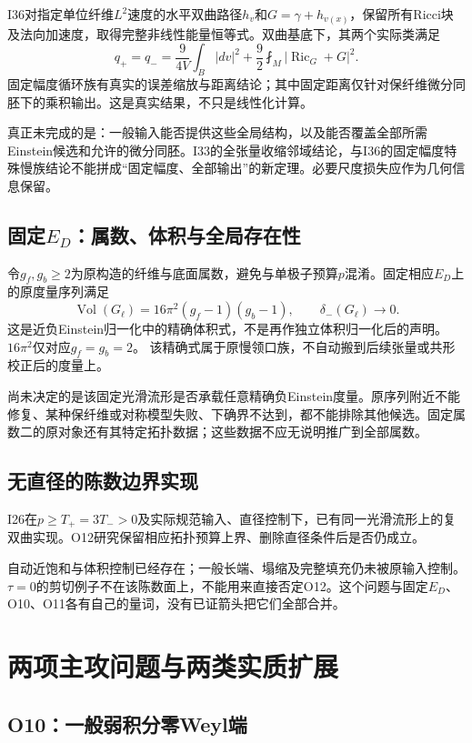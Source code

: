 \documentclass[UTF8,fontset=fandol,zihao=-4,a4paper]{ctexart}
\theoremstyle{remark}
\DeclareMathOperator{\Ric}{Ric}
\DeclareMathOperator{\Vol}{Vol}
\newcommand{\avg}{\mathop{\fint}}
\begin{document}
I36对指定单位纤维$L^2$速度的水平双曲路径$h_v$和$G=\gamma+h_{v(x)}$，保留所有Ricci块及法向加速度，取得完整非线性能量恒等式。双曲基底下，其两个实际类满足
\[
q_+=q_-=\frac9{4V}\int_B|dv|^2+\frac92\avg_M|\Ric_G+G|^2.
\]
固定幅度循环族有真实的误差缩放与距离结论；其中固定距离仅针对保纤维微分同胚下的乘积输出。这是真实结果，不只是线性化计算。

真正未完成的是：一般输入能否提供这些全局结构，以及能否覆盖全部所需Einstein候选和允许的微分同胚。I33的全张量收缩邻域结论，与I36的固定幅度特殊慢族结论不能拼成“固定幅度、全部输出”的新定理。必要尺度损失应作为几何信息保留。

\subsection{固定\texorpdfstring{$E_D$}{E-D}：属数、体积与全局存在性}

令$g_f,g_b\ge2$为原构造的纤维与底面属数，避免与单极子预算$p$混淆。固定相应$E_D$上的原度量序列满足
\begin{equation}
\Vol(G_\ell)=16\pi^2(g_f-1)(g_b-1),
\qquad \delta_-(G_\ell)\longrightarrow0.
\label{eq:EDvolume}
\end{equation}
这是近负Einstein归一化中的精确体积式，不是再作独立体积归一化后的声明。$16\pi^2$仅对应$g_f=g_b=2$。
该精确式属于原慢领口族，不自动搬到后续张量或共形校正后的度量上。

尚未决定的是该固定光滑流形是否承载任意精确负Einstein度量。原序列附近不能修复、某种保纤维或对称模型失败、下确界不达到，都不能排除其他候选。固定属数二的原对象还有其特定拓扑数据；这些数据不应无说明推广到全部属数。

\subsection{无直径的陈数边界实现}

I26在$p\ge T_+=3T_->0$及实际规范输入、直径控制下，已有同一光滑流形上的复双曲实现。O12研究保留相应拓扑预算上界、删除直径条件后是否仍成立。

自动近饱和与体积控制已经存在；一般长端、塌缩及完整填充仍未被原输入控制。$\tau=0$的剪切例子不在该陈数面上，不能用来直接否定O12。这个问题与固定$E_D$、O10、O11各有自己的量词，没有已证箭头把它们全部合并。

\section{两项主攻问题与两类实质扩展}
\label{sec:open}

\subsection{O10：一般弱积分零Weyl端}
\end{document}
